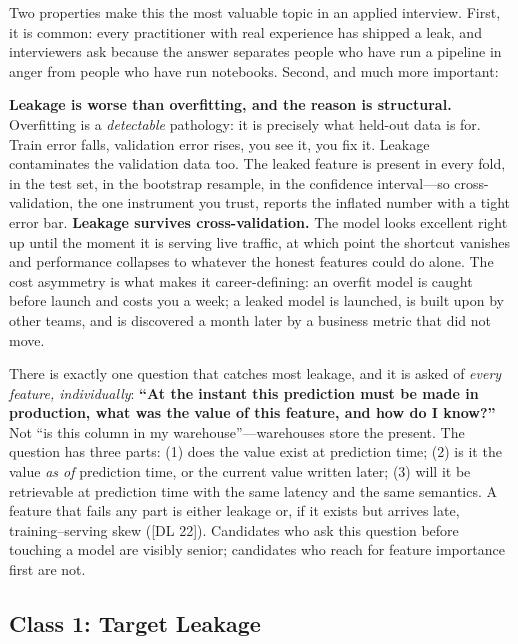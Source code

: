 Two properties make this the most valuable topic in an applied interview. First, it is common: every practitioner with real experience has shipped a leak, and interviewers ask because the answer separates people who have run a pipeline in anger from people who have run notebooks. Second, and much more important:

\begin{warningbox}
\textbf{Leakage is worse than overfitting, and the reason is structural.} Overfitting is a \emph{detectable} pathology: it is precisely what held-out data is for. Train error falls, validation error rises, you see it, you fix it. Leakage contaminates the validation data too. The leaked feature is present in every fold, in the test set, in the bootstrap resample, in the confidence interval---so cross-validation, the one instrument you trust, reports the inflated number with a tight error bar. \textbf{Leakage survives cross-validation.} The model looks excellent right up until the moment it is serving live traffic, at which point the shortcut vanishes and performance collapses to whatever the honest features could do alone. The cost asymmetry is what makes it career-defining: an overfit model is caught before launch and costs you a week; a leaked model is launched, is built upon by other teams, and is discovered a month later by a business metric that did not move.
\end{warningbox}

\begin{keyinsight}
There is exactly one question that catches most leakage, and it is asked of \emph{every feature, individually}: \textbf{``At the instant this prediction must be made in production, what was the value of this feature, and how do I know?''} Not ``is this column in my warehouse''---warehouses store the present. The question has three parts: (1) does the value exist at prediction time; (2) is it the value \emph{as of} prediction time, or the current value written later; (3) will it be retrievable at prediction time with the same latency and the same semantics. A feature that fails any part is either leakage or, if it exists but arrives late, training--serving skew ([DL 22]). Candidates who ask this question before touching a model are visibly senior; candidates who reach for feature importance first are not.
\end{keyinsight}

\subsection{Class 1: Target Leakage}

